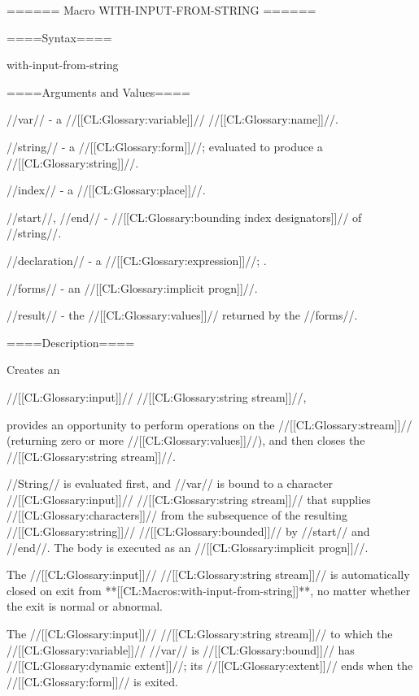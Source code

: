 ====== Macro WITH-INPUT-FROM-STRING ======

====Syntax====

\DefmacWithValuesNewline with-input-from-string {  } {}

====Arguments and Values====

//var// - a //[[CL:Glossary:variable]]// //[[CL:Glossary:name]]//.

//string// - a //[[CL:Glossary:form]]//; evaluated to produce a //[[CL:Glossary:string]]//.

//index// - a //[[CL:Glossary:place]]//.

//start//, //end// - //[[CL:Glossary:bounding index designators]]// of //string//. 

//declaration// - a  //[[CL:Glossary:expression]]//; \noeval.

//forms// - an //[[CL:Glossary:implicit progn]]//.

//result// - the //[[CL:Glossary:values]]// returned by the //forms//.

====Description====

Creates an

//[[CL:Glossary:input]]// //[[CL:Glossary:string stream]]//,

provides an opportunity to perform operations on the //[[CL:Glossary:stream]]// (returning zero or more //[[CL:Glossary:values]]//), and then closes the //[[CL:Glossary:string stream]]//.

//String// is evaluated first, and //var// is bound to a character //[[CL:Glossary:input]]// //[[CL:Glossary:string stream]]// that supplies //[[CL:Glossary:characters]]// from the subsequence of the resulting //[[CL:Glossary:string]]// //[[CL:Glossary:bounded]]// by //start// and //end//. The body is executed as an //[[CL:Glossary:implicit progn]]//.

The //[[CL:Glossary:input]]// //[[CL:Glossary:string stream]]// is automatically closed on exit from **[[CL:Macros:with-input-from-string]]**, no matter whether the exit is normal or abnormal.

The //[[CL:Glossary:input]]// //[[CL:Glossary:string stream]]// to which the //[[CL:Glossary:variable]]// //var// is //[[CL:Glossary:bound]]// has //[[CL:Glossary:dynamic extent]]//; its //[[CL:Glossary:extent]]// ends when the //[[CL:Glossary:form]]// is exited.

